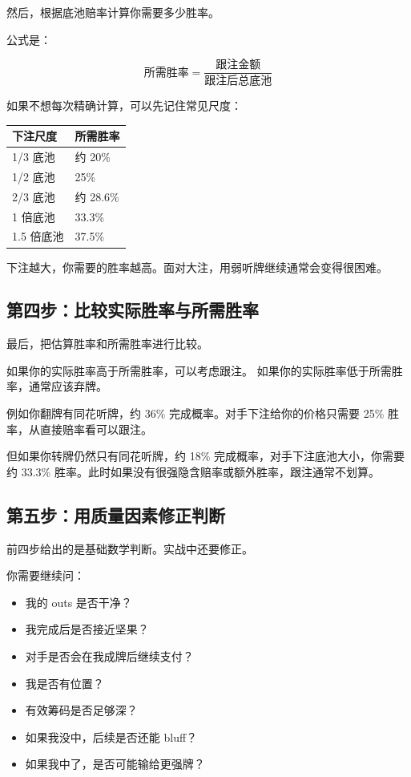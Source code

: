 然后，根据底池赔率计算你需要多少胜率。

公式是：

\[
\text{所需胜率} =
\frac{\text{跟注金额}}{\text{跟注后总底池}}
\]

如果不想每次精确计算，可以先记住常见尺度：

\begin{center}
\begin{tabular}{ll}
\toprule
\textbf{下注尺度} & \textbf{所需胜率} \\
\midrule
1/3 底池 & 约 20\% \\
1/2 底池 & 25\% \\
2/3 底池 & 约 28.6\% \\
1 倍底池 & 33.3\% \\
1.5 倍底池 & 37.5\% \\
\bottomrule
\end{tabular}
\end{center}

下注越大，你需要的胜率越高。面对大注，用弱听牌继续通常会变得很困难。

\subsection{第四步：比较实际胜率与所需胜率}

最后，把估算胜率和所需胜率进行比较。

如果你的实际胜率高于所需胜率，可以考虑跟注。
如果你的实际胜率低于所需胜率，通常应该弃牌。

例如你翻牌有同花听牌，约 36\% 完成概率。对手下注给你的价格只需要 25\% 胜率，从直接赔率看可以跟注。

但如果你转牌仍然只有同花听牌，约 18\% 完成概率，对手下注底池大小，你需要约 33.3\% 胜率。此时如果没有很强隐含赔率或额外胜率，跟注通常不划算。

\subsection{第五步：用质量因素修正判断}

前四步给出的是基础数学判断。实战中还要修正。

你需要继续问：

\begin{itemize}
\item 我的 outs 是否干净？
\item 我完成后是否接近坚果？
\item 对手是否会在我成牌后继续支付？
\item 我是否有位置？
\item 有效筹码是否足够深？
\item 如果我没中，后续是否还能 bluff？
\item 如果我中了，是否可能输给更强牌？
\end{itemize}

